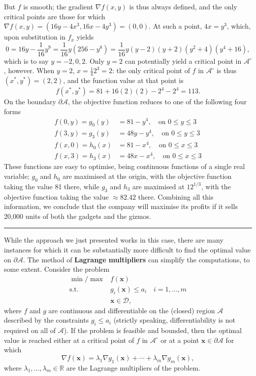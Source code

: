 But $f$ is smooth; the gradient $\nabla f(x,y)$ is thus always defined, and the only critical points are those for which $\nabla f(x,y)=(16y-4x^3,16x-4y^3)=(0,0)$. At such a point, $4x=y^3$, which, upon substitution in $f_x$ yields $$0=16y-\frac{1}{16}y^9=\frac{1}{16}y(256-y^8)=\frac{1}{16}y(y-2)(y+2)(y^2+4)(y^4+16), $$ which is to say $y=-2,0,2$. Only $y=2$ can potentially yield a critical point in $\mathcal{A}^{\circ}$, however. When $y=2$, $x=\frac{1}{4}2^3=2$: the only critical point of $f$ in $\mathcal{A}^{\circ}$ is thus $(x^*,y^*)=(2,2)$, and the function value at that point is $$f(x^*,y^*)=81+16(2)(2)-2^4-2^4=113.$$  On the boundary $\partial\!\! \mathcal{A}$, the objective function reduces to one of the following four forms 
\begin{align*} 
f(0,y)=g_0(y)&=81-y^4,\quad \mbox{on }0\leq y\leq 3 \\ 
f(3,y)=g_3(y)&=48y-y^4, \quad \mbox{on }0\leq y\leq 3 \\ 
f(x,0)=h_0(x)&=81-x^4,\quad \mbox{on }0\leq x\leq 3  \\ 
f(x,3)=h_3(x)&=48x-x^4, \quad \mbox{on }0\leq x\leq 3 
\end{align*}
These functions are easy to optimise, being continuous functions of a single real variable; $g_0$ and $h_0$ are maximised at the origin, with the objective function taking the value 81 there, while $g_3$ and $h_3$ are maximised at $12^{1/3}$, with the objective function taking the value $\approx 82.42$ there. \newl Combining all this information, we conclude that the company will maximise its profits if it sells 20,000 units of both the gadgets and the gizmos.  
\begin{center}\rule{0.5\linewidth}{.4pt}\end{center}
While the approach we just presented works in this case, there are many instances for which it can be substantially more difficult to find the optimal value on $\partial\!\!\mathcal{A}$. The method of \textbf{Lagrange multipliers} can simplify the computations, to some extent. \newl Consider the problem
\[\begin{array}{rl}
\min/\max & f(\mathbf{x}) \\
\mbox{s.t.}
 & g_i(\mathbf{x})\leq a_i \quad i = 1,\ldots,m \\
 & \mathbf{x} \in \mathcal{D},
\end{array}\]
where $f$ and $g$ are continuous and differentiable on the (closed) region $\mathcal{A}$ described by the constraints $g_i\leq a_i$ (strictly speaking, differentiability is not required on all of $\mathcal{A}$). If the problem is feasible and bounded, then the optimal value is reached either at a critical point of $f$ in $\mathcal{A}^{\circ}$ or at a point $\mathbf{x}\in\partial\!\! \mathcal{A}$ for which $$\nabla f(\mathbf{x})=\lambda_1 \nabla g_1(\mathbf{x})+\cdots + \lambda_m\nabla g_m(\mathbf{x}),$$ where $\lambda_1,\ldots,\lambda_m\in \mathbb{R}$ are the Lagrange multipliers of the problem.   
